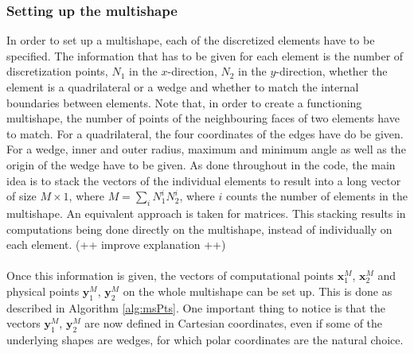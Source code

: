 \subsubsection{Setting up the multishape}
In order to set up a multishape, each of the discretized elements have to be specified. The information that has to be given for each element is the number of discretization points, $N_1$ in the $x$-direction, $N_2$ in the $y$-direction, whether the element is a quadrilateral or a wedge and whether to match the internal boundaries between elements. Note that, in order to create a functioning multishape, the number of points of the neighbouring faces of two elements have to match. For a quadrilateral, the four coordinates of the edges have do be given. For a wedge, inner and outer radius, maximum and minimum angle as well as the origin of the wedge have to be given. 
As done throughout in the code, the main idea is to stack the vectors of the individual elements to result into a long vector of size $M \times 1$, where $M = \sum_i N^i_1 N^i_2$, where $i$ counts the number of elements in the multishape. An equivalent approach is taken for matrices. This stacking results in computations being done directly on the multishape, instead of individually on each element. (++ improve explanation ++)
\\
\\
Once this information is given, the vectors of computational points $\mathbf x_1^M$, $\mathbf x_2^M$ and physical points $\mathbf y_1^M$, $\mathbf y_2^M$ on the whole multishape can be set up. This is done as described in Algorithm \ref{alg:msPts}.
One important thing to notice is that the vectors $\mathbf y_1^M$, $\mathbf y_2^M$ are now defined in Cartesian coordinates, even if some of the underlying shapes are wedges, for which polar coordinates are the natural choice.
\\

